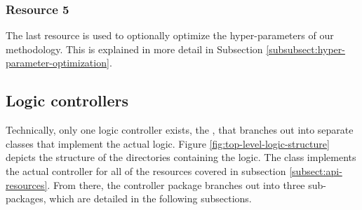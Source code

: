 \documentclass[12pt,a4paper]{report}
\begin{document}
\subsubsection{Resource 5}
The last resource is used to optionally optimize the
hyper\hyp parameters of our methodology. This is explained in more detail in
Subsection \ref{subsubsect:hyper-parameter-optimization}.


\subsection{Logic controllers}

Technically, only one logic controller exists, the ,
that branches out into separate classes that implement the actual logic. Figure
\ref{fig:top-level-logic-structure} depicts the structure of the directories
containing the logic. The  class implements the actual
controller for all of the  resources covered in subsection
\ref{subsect:api-resources}. From there, the  controller package
branches out into three sub-packages, which are detailed in the following
subsections.
\end{document}
